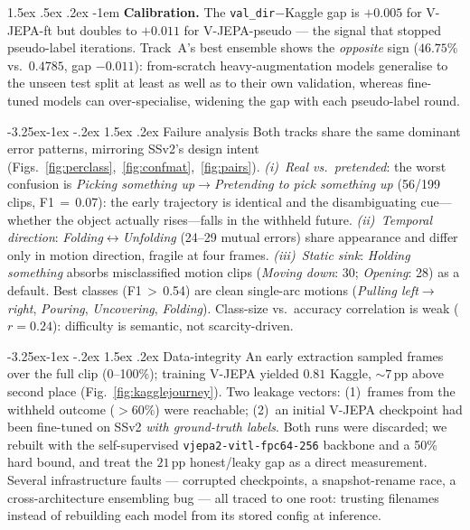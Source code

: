 \documentclass[10pt,twocolumn,letterpaper]{article}
\makeatletter
\renewcommand\subsection{\@startsection{subsection}{2}{\z@}%
  {-3.25ex\@plus -1ex \@minus -.2ex}%
  {1.5ex \@plus .2ex}%
  {\normalfont\large\bfseries}}
\renewcommand\paragraph{\@startsection{paragraph}{4}{\z@}%
  {1.5ex \@plus .5ex \@minus .2ex}%
  {-1em}%
  {\normalfont\normalsize\bfseries}}
\makeatother
\begin{document}
\paragraph{\textbf{Calibration.}}
The \texttt{val\_dir}$-$Kaggle gap is $+0.005$ for V-JEPA-ft but doubles to
$+0.011$ for V-JEPA-pseudo --- the signal that stopped pseudo-label iterations.
Track~A's best ensemble shows the \emph{opposite} sign ($46.75\%$ vs.\
$0.4785$, gap $-0.011$): from-scratch heavy-augmentation models generalise to
the unseen test split at least as well as to their own validation, whereas
fine-tuned models can over-specialise, widening the gap with each pseudo-label
round.

\subsection{Failure analysis}
\label{sec:failure}
Both tracks share the same dominant error patterns, mirroring SSv2's design
intent (Figs.~\ref{fig:perclass},~\ref{fig:confmat},~\ref{fig:pairs}).
\emph{(i)~Real vs.\ pretended}: the worst confusion is \emph{Picking something
up}$\to$\emph{Pretending to pick something up} (56/199 clips, F1\,$=$\,0.07):
the early trajectory is identical and the disambiguating cue---whether the
object actually rises---falls in the withheld future. \emph{(ii)~Temporal
direction}: \emph{Folding}$\leftrightarrow$\emph{Unfolding} (24--29 mutual
errors) share appearance and differ only in motion direction, fragile at four
frames. \emph{(iii)~Static sink}: \emph{Holding something} absorbs misclassified
motion clips (\emph{Moving down}: 30; \emph{Opening}: 28) as a default. Best
classes (F1\,$>$\,0.54) are clean single-arc motions (\emph{Pulling
left$\to$right}, \emph{Pouring}, \emph{Uncovering}, \emph{Folding}).
Class-size vs.\ accuracy correlation is weak ($r{=}0.24$): difficulty is
semantic, not scarcity-driven.

\subsection{Data-integrity}
\label{sec:integrity}
An early extraction sampled frames over the full clip (0--100\%); training
V-JEPA yielded $0.81$ Kaggle, ${\sim}7$\,pp above second place
(Fig.~\ref{fig:kagglejourney}). Two leakage vectors: (1)~frames from the
withheld outcome ($>60\%$) were reachable; (2)~an initial V-JEPA checkpoint
had been fine-tuned on SSv2 \emph{with ground-truth labels}. Both runs were
discarded; we rebuilt with the self-supervised
\texttt{vjepa2-vitl-fpc64-256} backbone and a 50\% hard bound, and treat the
$21$\,pp honest/leaky gap as a direct measurement. Several infrastructure
faults --- corrupted checkpoints, a snapshot-rename race, a cross-architecture
ensembling bug --- all traced to one root: trusting filenames instead of
rebuilding each model from its stored config at inference.
\end{document}
